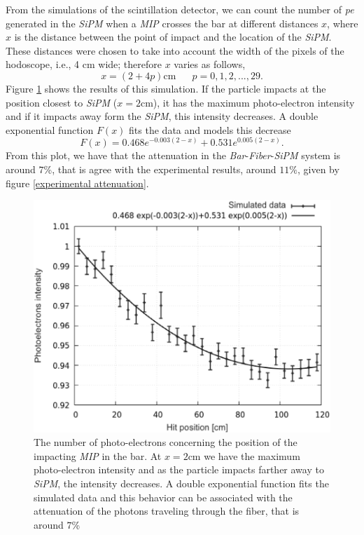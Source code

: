 \documentclass[submitting]{nst}
\begin{document}
From the simulations of the scintillation detector, we can count the number of \textsl{pe} generated in the \textsl{SiPM} when a \textsl{MIP} crosses the bar at different distances $x$, where $x$ is the distance between the point of impact and the location of the \textsl{SiPM}. These distances were chosen to take into account the width of the pixels of the hodoscope, i.e., 4 cm wide; therefore $x$ varies as follows,
\begin{equation}
    x = (2+4p)\text{cm} \,\,\,\,\,\,\,\,\,\, p=0,1,2,...,29.
\end{equation}
Figure \ref{atenuacion_barra} shows the results of this simulation. If the particle impacts at the position closest to \textsl{SiPM} ($x=2$cm), it has the maximum photo-electron intensity and if it impacts  away form the \textsl{SiPM}, this intensity decreases. A double exponential function $F(x)$ fits the data and models this decrease
\begin{equation}
F(x)= \text{0.468}e^{-0.003(2-x)} + \text{0.531}e^{0.005(2-x)}.
\end{equation}
From this plot, we have that the attenuation in the \textsl{Bar}-\textsl{Fiber}-\textsl{SiPM} system is around $7$\%, that is agree with the experimental results, around $11\%$, given by figure \ref{experimental attenuation}.
\begin{figure}[h!]
    \centering
        \includegraphics[scale=0.41]{Figures/atenuacion_barra_2.png}
   \caption{The number of photo-electrons concerning the position of the impacting \textsl{MIP} in the bar.    At $x=2$cm we have the maximum photo-electron intensity and as the particle impacts farther away to \textsl{SiPM}, the intensity decreases. A double exponential function fits the simulated data and this behavior can be associated with the attenuation of the photons traveling through the fiber, that is around $7$\%}
   \label{atenuacion_barra}
\end{figure}
\end{document}
